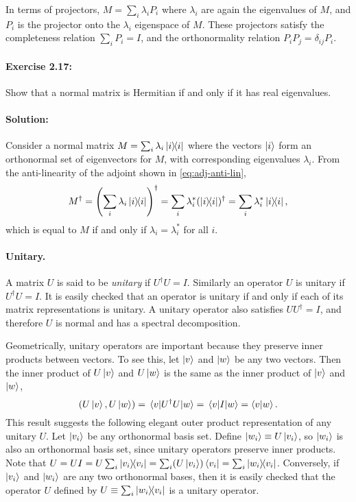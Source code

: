 In terms of projectors, $M = \sum_i \lambda_i P_i$ where $\lambda_i$ are again
the eigenvalues of $M$, and $P_i$ is the projector onto the $\lambda_i$
eigenspace of $M$. These projectors satisfy the completeness relation $\sum_i
P_i = I$, and the orthonormality relation $P_iP_j = \delta_{ij}P_i$.

\paragraph{Exercise 2.17:} Show that a normal matrix is Hermitian if and only
if it has real eigenvalues.

\paragraph{Solution:} Consider a normal matrix $M = \sum_i \lambda_i
\ketbra{i}{i}$ where the vectors $\ket{i}$ form an orthonormal set of
eigenvectors for $M$, with corresponding eigenvalues $\lambda_i$. From the
anti-linearity of the adjoint shown in \eqref{eq:adj-anti-lin},
\begin{equation*}
  M^\dagger = \left(\sum_i \lambda_i \ketbra{i}{i}\right)^\dagger = \sum_i
    \lambda_i^* (\ketbra{i}{i})^\dagger = \sum_i \lambda_i^* \ketbra{i}{i},
\end{equation*} which is equal to $M$ if and only if $\lambda_i = \lambda_i^*$
for all $i$.

\paragraph{Unitary.} A matrix $U$ is said to be \emph{unitary} if $U^\dagger U
= I$. Similarly an operator $U$ is unitary if $U^\dagger U = I$. It is easily
checked that an operator is unitary if and only if each of its matrix
representations is unitary. A unitary operator also satisfies $U U^\dagger =
I$, and therefore $U$ is normal and has a spectral decomposition.

Geometrically, unitary operators are important because they preserve inner
products between vectors. To see this, let $\ket{v}$ and $\ket{w}$ be any two
vectors. Then the inner product of $U\ket{v}$ and $U\ket{w}$ is the same as the
inner product of $\ket{v}$ and $\ket{w}$, \begin{equation*}
  (U\ket{v}, U\ket{w}) = \mel{v}{U^\dagger U}{w} = \mel{v}{I}{w} =
    \braket{v}{w}.
\end{equation*} This result suggests the following elegant outer product
representation of any unitary $U$. Let $\ket{v_i}$ be any orthonormal basis
set. Define $\ket{w_i} \equiv U\ket{v_i}$, so $\ket{w_i}$ is also an
orthonormal basis set, since unitary operators preserve inner products. Note
that $U = UI = U\sum_i \ketbra{v_i}{v_i} = \sum_i (U\ket{v_i})\bra{v_i} =
\sum_i \ketbra{w_i}{v_i}$. Conversely, if $\ket{v_i}$ and $\ket{w_i}$ are any
two orthonormal bases, then it is easily checked that the operator $U$ defined
by $U \equiv \sum_i \ketbra{w_i}{v_i}$ is a unitary operator.

